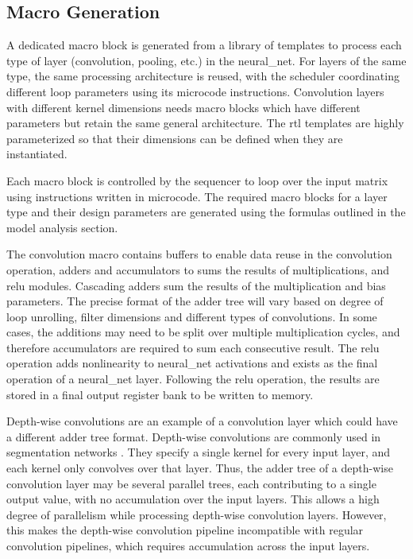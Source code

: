 \documentclass{uw-ece-wkrpt}
\begin{document}
\subsection{Macro Generation}\label{sec:macro_gen}

A dedicated macro block is generated from a library of templates to process each type of layer (convolution, pooling, etc.) in the \gls{neural_net}. For layers of the same type, the same processing architecture is reused, with the scheduler coordinating different loop parameters using its microcode instructions. Convolution layers with different \gls{kernel} dimensions needs macro blocks which have different parameters but retain the same general architecture. The \gls{rtl} templates are highly parameterized so that their dimensions can be defined when they are instantiated.

Each macro block is controlled by the sequencer to loop over the input matrix using instructions written in microcode. The required macro blocks for a layer type and their design parameters are generated using the formulas outlined in the model analysis section.

The convolution macro contains buffers to enable data reuse in the convolution operation, adders and accumulators to sums the results of multiplications, and \gls{relu} modules. Cascading adders sum the results of the multiplication and \gls{bias} parameters. The precise format of the adder tree will vary based on degree of loop unrolling, \gls{filter} dimensions and different types of convolutions. In some cases, the additions may need to be split over multiple multiplication cycles, and therefore accumulators are required to sum each consecutive result. The \gls{relu} operation adds nonlinearity to \gls{neural_net} activations and exists as the final operation of a \gls{neural_net} layer. Following the \gls{relu} operation, the results are stored in a final output register bank to be written to memory.

Depth-wise convolutions are an example of a convolution layer which could have a different adder tree format. Depth-wise convolutions are commonly used in segmentation networks \cite{Howard2017MobileNets:-Eff}. They specify a single \gls{kernel} for every input layer, and each \gls{kernel} only convolves over that layer. Thus, the adder tree of a depth-wise convolution layer may be several parallel trees, each contributing to a single output value, with no accumulation over the input layers. This allows a high degree of parallelism while processing depth-wise convolution layers. However, this makes the depth-wise convolution pipeline incompatible with regular convolution pipelines, which requires accumulation across the input layers.
\end{document}
